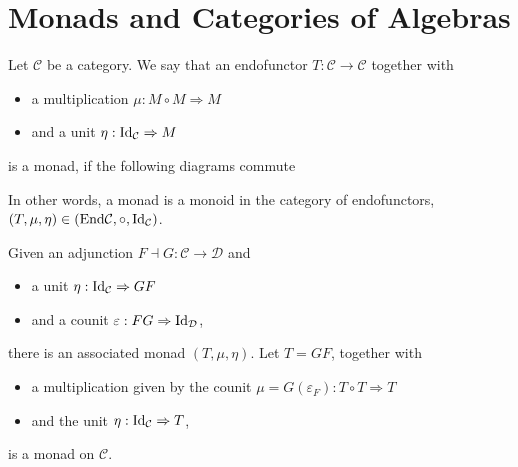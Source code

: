 \documentclass[../thesis.tex]{subfiles}
\begin{document}
    \section{Monads and Categories of Algebras}
        \begin{definition}[Monad]
            Let $\mathcal{C}$ be a category. We say that an endofunctor $T : \mathcal{C} \rightarrow \mathcal{C}$ together with
            \begin{itemize}
                \item a multiplication $\mu : M\circ M \Rightarrow M$
                \item and a unit $\eta : \tt{Id}_{\mathcal{C}} \Rightarrow M$
            \end{itemize}
            is a monad, if the following diagrams commute
            \begin{center}
            \end{center}
        \end{definition}
        In other words, a monad is a monoid in the category of endofunctors, $(T, \mu, \eta) \in (\tt{End}\mathcal{C}, \circ, \tt{Id}_\mathcal{C})$.

        \begin{lemma}
            Given an adjunction $F \dashv G : \mathcal{C} \rightarrow \mathcal{D}$ and
            \begin{itemize}
                \item a unit $\eta : \tt{Id}_\mathcal{C} \Rightarrow GF$
                \item and a counit $\varepsilon : FG \Rightarrow \tt{Id}_\mathcal{D}$,
            \end{itemize} 
            there is an associated monad $(T, \mu, \eta)$. Let $T = GF$, together with
            \begin{itemize}
                \item a multiplication given by the counit $\mu = G(\varepsilon_F) : T\circ T \Rightarrow T$
                \item and the unit $\eta : \tt{Id}_\mathcal{C} \Rightarrow T$,
            \end{itemize}
            is a monad on $\mathcal{C}$.
        \end{lemma}
\end{document}
